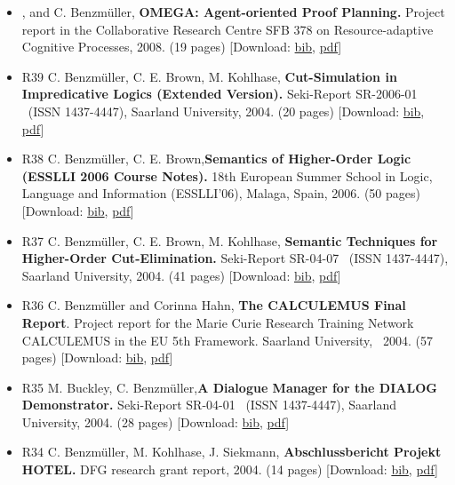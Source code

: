 \documentclass{article}
\newcommand{\tmtextbf}[1]{{\bfseries{#1}}}
\newcommand{\tmtextit}[1]{{\itshape{#1}}}
\newcommand{\tmtextmd}[1]{{\mdseries{#1}}}
\newcommand{\tmtextup}[1]{{\upshape{#1}}}
\newenvironment{itemizedot}{\begin{itemize} \renewcommand{\labelitemi}{$\bullet$}\renewcommand{\labelitemii}{$\bullet$}\renewcommand{\labelitemiii}{$\bullet$}\renewcommand{\labelitemiv}{$\bullet$}}{\end{itemize}}
\begin{document}
\begin{itemizedot}
  \item {\small \tmtextup{\tmtextmd{[R40] J. Siekmann,}
  }\tmtextit{\tmtextmd{\tmtextup{S. Autexier}}}, and C. Benzm\"uller,
  \tmtextbf{OMEGA: Agent-oriented Proof Planning.} Project report in the
  Collaborative Research Centre SFB 378 on Resource-adaptive Cognitive
  Processes, 2008. (19 pages)} {\color{grey} [Download: {\small
  \href{../papers/R40.bib}{bib}}, {\small \href{../papers/R40.pdf}{pdf}}]}
  
  \item [R39] C. Benzm\"uller, C. E. Brown, M. Kohlhase,{\small 
  \tmtextbf{Cut-Simulation in Impredicative Logics (Extended Version).}}
  {\small Seki-Report SR-2006-01 \ (ISSN 1437-4447), Saarland University,
  2004. (20 pages)} {\color{grey} [Download: {\small
  \href{../papers/R39.bib}{bib}, \href{../papers/R39.pdf}{pdf}}]}
  
  \item [R38] C. Benzm\"uller, C. E. Brown,{\small  \tmtextbf{Semantics of
  Higher-Order Logic (ESSLLI 2006 Course Notes).}} 18th European Summer School
  in Logic, Language and Information ({\small ESSLLI'06), Malaga, Spain, 2006.
  (50 pages)} {\color{grey} [Download: {\small \href{../papers/R38.bib}{bib}},
  {\small \href{../papers/R38.pdf}{pdf}}]}
  
  \item [R37] C. Benzm\"uller, C. E. Brown, M. Kohlhase,{\small 
  \tmtextbf{Semantic Techniques for Higher-Order Cut-Elimination.}} {\small
  Seki-Report SR-04-07 \ (ISSN 1437-4447), Saarland University, 2004. (41
  pages)} {\color{grey} [Download: {\small \href{../papers/R37.bib}{bib},
  \href{../papers/R37.pdf}{pdf}}]}
  
  \item [R36] C. Benzm\"uller and Corinna Hahn, \tmtextbf{The CALCULEMUS Final
  Report}. Project report for the Marie Curie Research Training Network
  CALCULEMUS in the EU 5th Framework. Saarland University, \ 2004. (57 pages)
  {\color{grey} [Download: {\small \href{../papers/R36.bib}{bib},
  \href{../papers/R36.pdf}{pdf}}]}
  
  \item [R35] M. Buckley, C. Benzm\"uller,{\small  \tmtextbf{A Dialogue
  Manager for the DIALOG Demonstrator.}} {\small Seki-Report SR-04-01 \ (ISSN
  1437-4447), Saarland University, 2004. (28 pages)} {\color{grey} [Download:
  {\small \href{../papers/R35.bib}{bib}, \href{../papers/R35.pdf}{pdf}}]}
  
  \item [R34] C. Benzm\"uller, M. Kohlhase, J. Siekmann,
  \tmtextbf{Abschlussbericht Projekt HOTEL.} DFG research grant report, 2004.
  (14 pages) {\color{grey} [Download: {\small \href{../papers/R34.bib}{bib},
  \href{../papers/R34.pdf}{pdf}}]}
  

\end{itemizedot}
\end{document}

